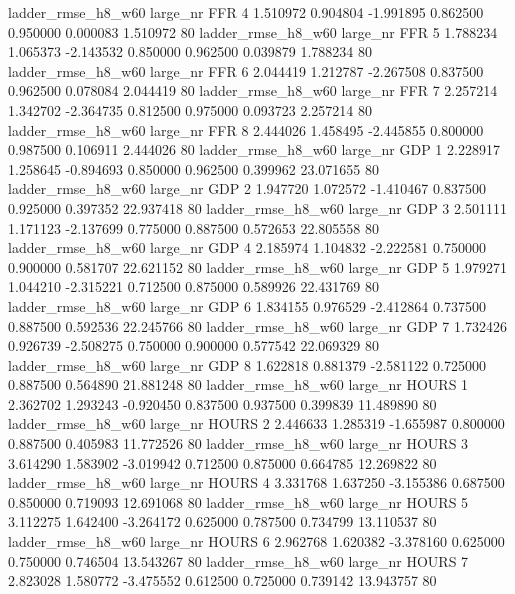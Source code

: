  ladder_rmse_h8_w60   large_nr      FFR                 4  1.510972  0.904804  -1.991895 0.862500 0.950000  0.000083    1.510972 80
 ladder_rmse_h8_w60   large_nr      FFR                 5  1.788234  1.065373  -2.143532 0.850000 0.962500  0.039879    1.788234 80
 ladder_rmse_h8_w60   large_nr      FFR                 6  2.044419  1.212787  -2.267508 0.837500 0.962500  0.078084    2.044419 80
 ladder_rmse_h8_w60   large_nr      FFR                 7  2.257214  1.342702  -2.364735 0.812500 0.975000  0.093723    2.257214 80
 ladder_rmse_h8_w60   large_nr      FFR                 8  2.444026  1.458495  -2.445855 0.800000 0.987500  0.106911    2.444026 80
 ladder_rmse_h8_w60   large_nr      GDP                 1  2.228917  1.258645  -0.894693 0.850000 0.962500  0.399962   23.071655 80
 ladder_rmse_h8_w60   large_nr      GDP                 2  1.947720  1.072572  -1.410467 0.837500 0.925000  0.397352   22.937418 80
 ladder_rmse_h8_w60   large_nr      GDP                 3  2.501111  1.171123  -2.137699 0.775000 0.887500  0.572653   22.805558 80
 ladder_rmse_h8_w60   large_nr      GDP                 4  2.185974  1.104832  -2.222581 0.750000 0.900000  0.581707   22.621152 80
 ladder_rmse_h8_w60   large_nr      GDP                 5  1.979271  1.044210  -2.315221 0.712500 0.875000  0.589926   22.431769 80
 ladder_rmse_h8_w60   large_nr      GDP                 6  1.834155  0.976529  -2.412864 0.737500 0.887500  0.592536   22.245766 80
 ladder_rmse_h8_w60   large_nr      GDP                 7  1.732426  0.926739  -2.508275 0.750000 0.900000  0.577542   22.069329 80
 ladder_rmse_h8_w60   large_nr      GDP                 8  1.622818  0.881379  -2.581122 0.725000 0.887500  0.564890   21.881248 80
 ladder_rmse_h8_w60   large_nr    HOURS                 1  2.362702  1.293243  -0.920450 0.837500 0.937500  0.399839   11.489890 80
 ladder_rmse_h8_w60   large_nr    HOURS                 2  2.446633  1.285319  -1.655987 0.800000 0.887500  0.405983   11.772526 80
 ladder_rmse_h8_w60   large_nr    HOURS                 3  3.614290  1.583902  -3.019942 0.712500 0.875000  0.664785   12.269822 80
 ladder_rmse_h8_w60   large_nr    HOURS                 4  3.331768  1.637250  -3.155386 0.687500 0.850000  0.719093   12.691068 80
 ladder_rmse_h8_w60   large_nr    HOURS                 5  3.112275  1.642400  -3.264172 0.625000 0.787500  0.734799   13.110537 80
 ladder_rmse_h8_w60   large_nr    HOURS                 6  2.962768  1.620382  -3.378160 0.625000 0.750000  0.746504   13.543267 80
 ladder_rmse_h8_w60   large_nr    HOURS                 7  2.823028  1.580772  -3.475552 0.612500 0.725000  0.739142   13.943757 80
